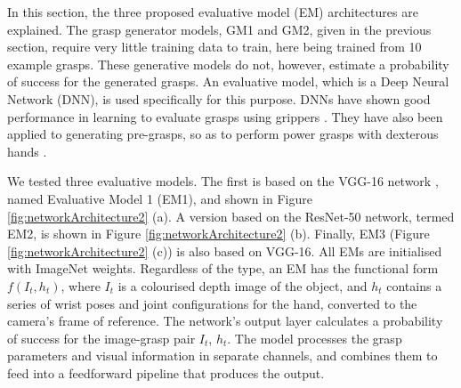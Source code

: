 In this section, the three proposed evaluative model (EM) architectures are explained. The grasp generator models, GM1 and GM2, given in the previous section, require very little training data to train, here being trained from 10 example grasps. %
These generative models do not, however, estimate a probability of success for the generated grasps. An evaluative model, which is a Deep Neural Network (DNN), is used specifically for this purpose. DNNs have shown good performance in learning to evaluate grasps using grippers \cite{levine16,lenz2015deep}. They have also been applied to generating pre-grasps, so as to perform power grasps with dexterous hands \cite{varley2015generating,lu2017planning}.


We tested three evaluative models. The first is based on the VGG-16 network \cite{Simonyan14c}, named Evaluative Model 1 (EM1), and shown in Figure \ref{fig:networkArchitecture2} (a). A version based on the ResNet-50 network, termed EM2, is shown in Figure \ref{fig:networkArchitecture2} (b). Finally, EM3 (Figure \ref{fig:networkArchitecture2} (c)) is also based on VGG-16. All EMs are initialised with ImageNet weights. Regardless of the type, an EM has the functional form $f(I_t, h_t)$, where $I_t$ is a colourised depth image of the object, and $h_t$ contains a series of wrist poses and joint configurations for the hand, converted to the camera's frame of reference. The network's output layer calculates a probability of success for the image-grasp pair $I_t$, $h_t$. The model processes the grasp parameters and visual information in separate channels, and combines them to feed into a feedforward pipeline that produces the output.

